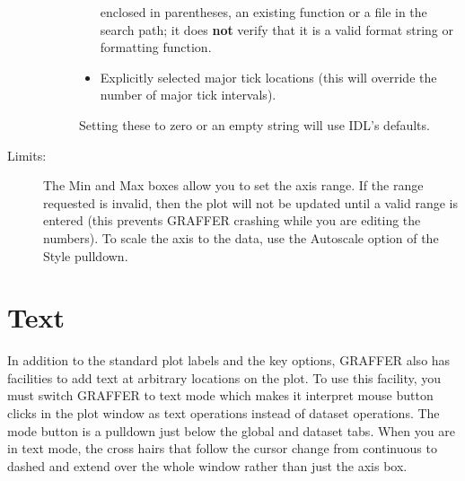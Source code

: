 \documentclass[11pt,twoside,english]{article}
\begin{document}
\begin{description}
\begin{description}
\begin{itemize}
    enclosed in parentheses, an existing function or a file in the
    search path; it does \textbf{not} verify that it is a valid format
    string or formatting function.
  \item Explicitly selected major tick locations (this will override
    the number of major tick intervals).
  \end{itemize}
  Setting these to zero or an empty string will use IDL's defaults.
\end{description}
\item [Limits:]The Min and Max boxes allow you to set the axis
  range. If the range requested is invalid, then the plot will not be
  updated until a valid range is entered (this prevents GRAFFER
  crashing while you are editing the numbers). To scale the axis to the
  data, use the Autoscale option of the Style pulldown.
\end{description}

\section{Text}
\label{sec:text}

In addition to the standard plot labels and the key options, GRAFFER
also has facilities to add text at arbitrary locations on the plot.  To
use this facility, you must switch GRAFFER to text mode which makes it
interpret mouse button clicks in the plot window as text operations
instead of dataset operations. The mode button is a pulldown just below
the global and dataset tabs.  When you are in text mode, the cross
hairs that follow the cursor change from continuous to dashed and
extend over the whole window rather than just the axis box.
\end{document}
